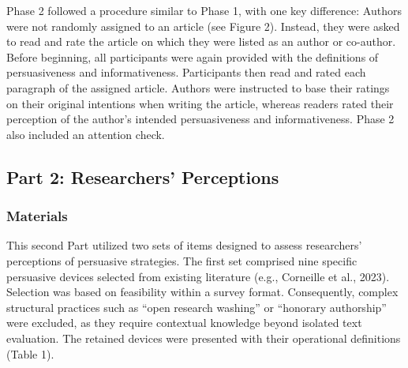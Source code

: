 \documentclass[authordate, meta]{jote-new-article}
\begin{document}
	Phase 2 followed a procedure similar to Phase 1, with one key difference: Authors were not randomly assigned to an article (see Figure 2). Instead, they were asked to read and rate the article on which they were listed as an author or co-author. Before beginning, all participants were again provided with the definitions of persuasiveness and informativeness. Participants then read and rated each paragraph of the assigned article. Authors were instructed to base their ratings on their original intentions when writing the article, whereas readers rated their perception of the author's intended persuasiveness and informativeness. Phase 2 also included an attention check.



	\subsection{Part 2: Researchers' Perceptions}



	\subsubsection{Materials}



	This second Part utilized two sets of items designed to assess researchers' perceptions of persuasive strategies. The first set comprised nine specific persuasive devices selected from existing literature (e.g., Corneille et al., 2023). Selection was based on feasibility within a survey format. Consequently, complex structural practices such as “open research washing” or “honorary authorship” were excluded, as they require contextual knowledge beyond isolated text evaluation. The retained devices were presented with their operational definitions (Table 1).
\end{document}
